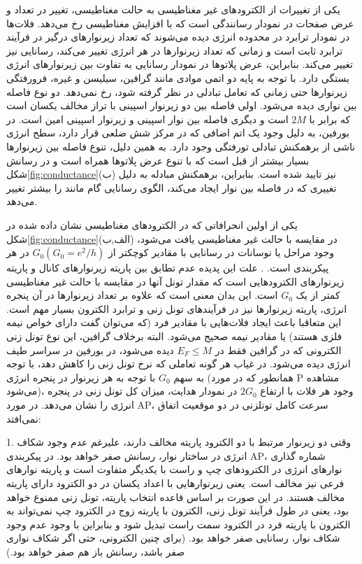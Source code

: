 یکی از تغییرات از الکترودهای غیر مغناطیسی به حالت مغناطیسی، تغییر در تعداد و عرض صفحات در نمودار رسانندگی است که با افزایش مغناطیسی رخ ‌‌می‌‌دهد. فلات‌ها در نمودار ترابرد در محدوده انرژی دیده ‌‌می‌‌شوند که تعداد زیر‌نوارهای درگیر در فرآیند ترابرد ثابت است و زمانی که تعداد زیر‌نوارها در هر انرژی تغییر ‌‌می‌‌کند، رسانایی نیز تغییر ‌‌می‌‌کند. بنابراین، عرض پلاتوها در نمودار رسانایی به تفاوت بین زیر‌نوارهای انرژی بستگی دارد. با توجه به پایه دو  اتمی‌‌ موادی مانند گرافین، سیلیسن و غیره، فرورفتگی زیر‌نوارها حتی زمانی که تعامل تبادلی در نظر گرفته شود، رخ نمی‌‌دهد. دو نوع فاصله بین نواری دیده ‌‌می‌‌شود. اولی فاصله بین دو زیر‌نوار اسپینی با تراز مخالف یکسان است که برابر با $2M$ است و دیگری فاصله بین نوار اسپینی  و زیر‌نوار اسپینی ا‌مین است. در ‌بورفین، به دلیل وجود یک اتم اضافی که در مرکز شش ضلعی قرار دارد، سطح انرژی ناشی از برهمکنش تبادلی تورفتگی وجود دارد. به همین دلیل، تنوع فاصله بین زیر‌نوارها بسیار بیشتر از قبل است که با تنوع عرض پلاتوها همراه است و در رسانش شکل\ref{fig:conductance}(ب) نیز تایید شده است. بنابراین، برهمکنش مبادله به دلیل تغییری که در فاصله بین نوار ایجاد ‌‌می‌‌کند، الگوی رسانایی گام مانند را بیشتر تغییر ‌‌می‌‌دهد. 

یکی از اولین انحرافاتی که در الکترودهای مغناطیسی نشان داده شده در شکل\ref{fig:conductance}(الف,ب) در مقایسه با حالت غیر مغناطیسی یافت ‌‌می‌‌شود، وجود مراحل یا نوسانات در رسانایی با مقادیر کوچکتر از $G_0 (G_0 = e^2/h)$ در هر پیکربندی است. . علت این پدیده عدم تطابق بین پاریته زیر‌نوارهای کانال و پاریته زیر‌نوارهای الکترودهایی است که مقدار تونل آنها در مقایسه با حالت غیر مغناطیسی کمتر از یک $G_0$ است. این بدان معنی است که علاوه بر تعداد زیر‌نوارها در آن پنجره انرژی، پاریته زیر‌نوارها نیز در فرآیندهای تونل زنی و ترابرد الکترون بسیار مهم است. این متعاقبا باعث ایجاد فلات‌هایی با مقادیر فرد (که ‌‌می‌‌توان گفت دارای خواص نیمه فلزی هستند) یا مقادیر نیمه صحیح ‌‌می‌‌شود. البته برخلاف گرافین، این نوع تونل زنی الکترونی که در گرافین فقط در $E_F\le M$ دیده ‌‌می‌‌شود، در ‌بورفین در سراسر طیف انرژی دیده ‌‌می‌‌شود.
در غیاب هر گونه تعاملی که نرخ تونل زنی را کاهش دهد، با توجه به سهم  $G_0$ با توجه به هر زیر‌نوار در پنجره انرژی (همانطور که در مورد P مشاهده ‌‌می‌‌شود)، وجود هر فلات با ارتفاع $2G_0$ در نمودار هدایت، ‌میزان کل تونل زنی در پنجره انرژی را نشان ‌‌می‌‌دهد. در مورد \gls{AP}، سرعت کامل تونلزنی در دو موقعیت اتفاق نمی‌افتد:

1. وقتی دو زیر‌نوار مرتبط با دو الکترود پاریته مخالف دارند، علیرغم عدم وجود شکاف انرژی در ساختار نوار، رسانش صفر خواهد بود. در پیکربندی \gls{AP}، شماره گذاری نوارهای انرژی در الکترودهای چپ و راست با یکدیگر متفاوت است و پاریته نوارهای فرعی نیز مخالف است. یعنی زیر‌نوارهایی با اعداد یکسان در دو الکترود دارای پاریته مخالف هستند. در این صورت بر اساس قاعده انتخاب پاریته، تونل زنی ممنوع خواهد بود، یعنی در طول فرآیند تونل زنی، الکترون با پاریته زوج در الکترود چپ نمی‌‌تواند به الکترون با پاریته فرد در الکترود سمت راست تبدیل شود و بنابراین با وجود عدم وجود شکاف نوار، رسانایی صفر خواهد بود. (برای چنین الکترونی، حتی اگر شکاف نواری صفر باشد، رسانش باز هم صفر خواهد بود.) 

